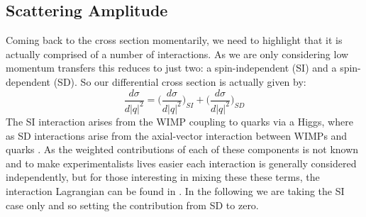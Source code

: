 \subsection{Scattering Amplitude}
\par
Coming back to the cross section momentarily, we need to highlight that it is actually comprised of a number of interactions.
As we are only considering low momentum transfers this reduces to just two: a spin-independent (SI) and a spin-dependent (SD).
So our differential cross section is actually given by:
\begin{equation}
    \frac{d\sigma}{d|q|^2} = \bigg(\frac{d\sigma}{d|q|^2}\bigg)_{SI} + \bigg(\frac{d\sigma}{d|q|^2}\bigg)_{SD}
\end{equation}
The SI interaction arises from the WIMP coupling to quarks via a Higgs, where as SD interactions arise from the axial-vector interaction between WIMPs and quarks \cite{supersymmetric_dark_matter_ref}.
As the weighted contributions of each of these components is not known and to make experimentalists lives easier each interaction is generally considered independently, but for those interesting in mixing these these terms, the interaction Lagrangian can be found in \cite{wimp_lagrangian_ref}.
In the following we are taking the SI case only and so setting the contribution from SD to zero.

